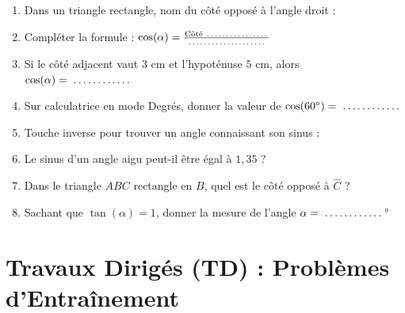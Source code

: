 \begin{automatisme}
\begin{enumerate}[label=\textbf{Q\arabic*.}, itemsep=1pt]
    \item Dans un triangle rectangle, nom du côté opposé à l'angle droit : \pointille[3.5cm]
    \item Compléter la formule : $\cos(\alpha) = \frac{\text{Côté \pointille[2cm]}}{\text{\pointille[2.5cm]}}$
    \item Si le côté adjacent vaut $3\text{ cm}$ et l'hypoténuse $5\text{ cm}$, alors $\cos(\alpha) = \pointille[2cm]$
    \item Sur calculatrice en mode Degrés, donner la valeur de $\cos(60^\circ) = \pointille[2cm]$
    \item Touche inverse pour trouver un angle connaissant son sinus : \pointille[2.5cm]
    \item Le sinus d'un angle aigu peut-il être égal à $1{,}35$ ? \pointille[3cm]
    \item Dans le triangle $ABC$ rectangle en $B$, quel est le côté opposé à $\widehat{C}$ ? \pointille[2.5cm]
    \item Sachant que $\tan(\alpha) = 1$, donner la mesure de l'angle $\alpha = \pointille[2cm]^\circ$
\end{enumerate}
\end{automatisme}

\section{Travaux Dirigés (TD) : Problèmes d'Entraînement}

